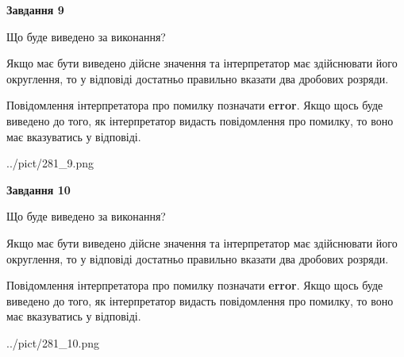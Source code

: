 \documentclass[12pt, ukrainian]{article}
\begin{document}
{\begin {Large}
{\begin {center}\textbf{Завдання 9}\end {center}}\par
Що буде виведено за виконання? \par

Якщо має бути виведено дійсне значення та інтерпретатор має здійснювати його округлення, 
то у відповіді достатньо правильно вказати два дробових розряди.

Повідомлення інтерпретатора про помилку позначати \textbf{error}.
Якщо щось буде виведено до того, як інтерпретатор видасть повідомлення про помилку, 
то воно має вказуватись у відповіді. \par

\begin{center}
	{../pict/281_9.png}
\end{center}
\newpage

{\begin {center}\textbf{Завдання 10}\end {center}}\par
Що буде виведено за виконання? \par

Якщо має бути виведено дійсне значення та інтерпретатор має здійснювати його округлення, 
то у відповіді достатньо правильно вказати два дробових розряди.

Повідомлення інтерпретатора про помилку позначати \textbf{error}.
Якщо щось буде виведено до того, як інтерпретатор видасть повідомлення про помилку, 
то воно має вказуватись у відповіді. \par

\begin{center}
	{../pict/281_10.png}
\end{center}
\newpage

\end {Large}}
\end{document}
